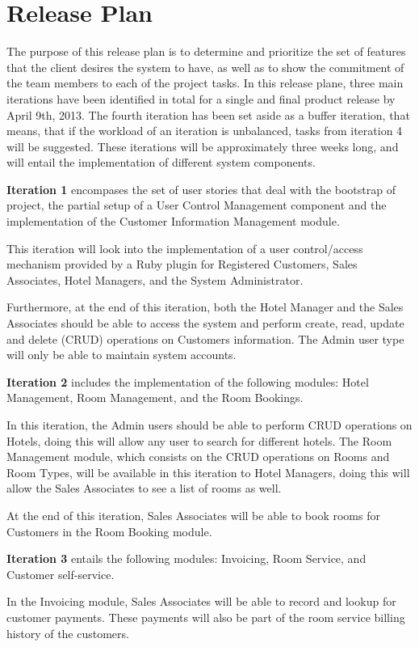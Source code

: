 \section{Release Plan}
The purpose of this release plan is to determine and prioritize the set of features that the client desires the system to have, as well as to show the commitment of the team members to each of the project tasks. In this release plane, three main iterations have been identified in total for a single and final product release by April 9th, 2013. The fourth iteration has been set aside as a buffer iteration, that means, that if the workload of an iteration is unbalanced, tasks from iteration 4 will be suggested. These iterations will be approximately three weeks long, and will entail the implementation of different system components. 

\textbf{Iteration 1} encompases the set of user stories that deal with the bootstrap of project, the partial setup of a User Control Management component and the implementation of the Customer Information Management module. 

This iteration will look into the implementation of a user control/access mechanism provided by a Ruby plugin for Registered Customers, Sales Associates, Hotel Managers, and the System Administrator. 

Furthermore, at the end of this iteration, both the Hotel Manager and the Sales Associates should be able to access the system and perform create, read, update and delete (CRUD) operations on Customers information. The Admin user type will only be able to maintain system accounts. 

\textbf{Iteration 2} includes the implementation of the following modules: Hotel Management, Room Management, and the Room Bookings.

In this iteration, the Admin users should be able to perform CRUD operations on Hotels, doing this will allow any user to search for different hotels. The Room Management module, which consists on the CRUD operations on Rooms and Room Types, will be available in this iteration to Hotel Managers, doing this will allow the Sales Associates to see a list of rooms as well.

At the end of this iteration, Sales Associates will be able to book rooms for Customers in the Room Booking module.

\textbf{Iteration 3} entails the following modules: Invoicing, Room Service, and Customer self-service. 

In the Invoicing module, Sales Associates will be able to record and lookup for customer payments. These payments will also be part of the room service billing history of the customers.

